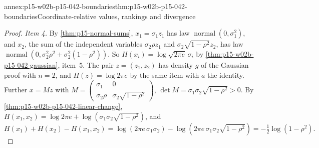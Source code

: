 \begin{annexitem}{annex:p15-w02b-p15-042-boundaries}{thm:p15-w02b-p15-042-boundaries}{Coordinate-relative values, rankings and divergence}
\begin{proof}
\emph{Item 4.} By \cref{thm:p15-normal-sums}, \(x_1=\sigma_1z_1\) has law
\(\operatorname{normal}(0,\sigma_1^2)\), and \(x_2\), the sum of the
independent variables \(\sigma_2\rho z_1\) and \(\sigma_2\sqrt{1-\rho^2}z_2\),
has law \(\operatorname{normal}(0,\sigma_2^2\rho^2+\sigma_2^2(1-\rho^2))\).
So \(H(x_i)=\log\sqrt{2\pi e}\,\sigma_i\) by
\cref{thm:p15-w02b-p15-042-gaussian}, item~5. The pair \(z=(z_1,z_2)\) has
density \(g\) of the Gaussian proof with \(n=2\), and \(H(z)=\log2\pi e\) by
the same item with \(a\) the identity. Further \(x=Mz\) with
\(M=\begin{pmatrix}\sigma_1&0\\ \sigma_2\rho&\sigma_2\sqrt{1-\rho^2}\end{pmatrix}\),
\(\det M=\sigma_1\sigma_2\sqrt{1-\rho^2}>0\). By
\cref{thm:p15-w02b-p15-042-linear-change},
\(H(x_1,x_2)=\log2\pi e+\log(\sigma_1\sigma_2\sqrt{1-\rho^2})\), and
\[
 H(x_1)+H(x_2)-H(x_1,x_2)
  =\log(2\pi e\,\sigma_1\sigma_2)-\log(2\pi e\,\sigma_1\sigma_2\sqrt{1-\rho^2})
  =-\tfrac12\log(1-\rho^2).
\]
\end{proof}
\end{annexitem}

